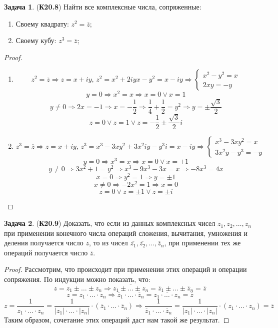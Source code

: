 \documentclass[12pt]{article}
\theoremstyle{definition}
\newtheorem{problem}{Задача}
\newcommand{\ovl}[1]{\overline{#1}}
\begin{document}
\begin{problem}(\textbf{К20.8})
	Найти все комплексные числа, сопряженные:
	\begin{enumerate}[label=\asbuk*)]
		\item Своему квадрату: $z^2 = \ovl{z}$;
		\item Своему кубу: $z^3 = \ovl{z}$;
	\end{enumerate}
\end{problem}
\begin{proof}\hfill
	\begin{enumerate}[label=\asbuk*)]
		\item 
		$$
			z^2 = \ovl{z} \Rightarrow z = x + iy, \, z^2 = x^2 + 2iyx - y^2 = x -iy \Rightarrow 		\begin{cases}
				x^2 - y^2 = x\\
				2xy = -y 
			\end{cases}
		$$
		$$
			y = 0 \Rightarrow x^2 = x \Rightarrow x = 0 \vee x = 1
		$$
		$$
			y \neq 0 \Rightarrow 2x = -1 \Rightarrow x = -\dfrac{1}{2} \Rightarrow \dfrac{1}{4} +\dfrac{1}{2} = y^2 \Rightarrow y = \pm \dfrac{\sqrt{3}}{2}
		$$
		$$
			z = 0 \vee z = 1 \vee z = -\dfrac{1}{2} \pm \dfrac{\sqrt{3}}{2}i
		$$
		\item
		$$
			z^3 = \ovl{z} \Rightarrow z = x + iy, \, z^3 = x^3 - 3xy^2 + 3x^2iy - y^3i = x - iy \Rightarrow \begin{cases}
				x^3 - 3xy^2 = x\\
				3x^2y -y^3 = - y
			\end{cases}
		$$
		$$
			y = 0 \Rightarrow x^3 = x \Rightarrow x = 0 \vee x = \pm 1
		$$
		$$
			y \neq 0 \Rightarrow 3x^2+ 1 = y^2 \Rightarrow x^3 - 9x^3 -3x =x \Rightarrow -8x^3 = 4x 
		$$
		$$
			x = 0 \Rightarrow y^2 = 1 \Rightarrow y = \pm 1
		$$
		$$
			x \neq 0 \Rightarrow -2x^2 = 1 \Rightarrow x = 0
		$$
		$$
			z = 0 \vee z = \pm 1 \vee z = \pm i
		$$
	\end{enumerate}
\end{proof}

\begin{problem}(\textbf{К20.9})
	Доказать, что если из данных комплексных чисел $z_1, z_2, \dotsc, z_n$ при применении конечного числа операций сложения, вычитания, умножения и деления получается число $z$, то из чисел $\ovl{z_1}, \ovl{z_2}, \dotsc, \ovl{z}_n$, при применении тех же операций получается число $\ovl{z}$.
\end{problem}
\begin{proof}
	Рассмотрим, что происходит при применении этих операций и операции сопряжения. По индукции можно показать, что:
	$$
		z = z_1 \pm \dotsc \pm z_n \Rightarrow  \ovl{z_1 \pm \dotsc \pm z_n} = \ovl{z}_1 \pm \dotsc \pm \ovl{z}_n  = \ovl{z}
	$$
	$$
		z = z_1{\cdot}\dotsc{\cdot}z_n \Rightarrow \ovl{z}_1{\cdot}\dotsc{\cdot}\ovl{z}_n = \ovl{z_1{\cdot}\dotsc{\cdot}z_n} = \ovl{z}
	$$
	$$
		z = \dfrac{1}{z_1{\cdot}\dotsc{\cdot}z_n} = \dfrac{1}{|z_1|{\cdot}\dotsc{\cdot}|z_n|}{\cdot}(\ovl{z}_1{\cdot}\dotsc{\cdot}\ovl{z}_n) \Rightarrow \dfrac{1}{\ovl{z}_1{\cdot}\dotsc{\cdot}\ovl{z}_n} = \dfrac{1}{|z_1|{\cdot}\dotsc{\cdot}|z_n|}{\cdot}(z_1{\cdot} \dotsc{\cdot}z_n) = \ovl{z}
	$$
	Таким образом, сочетание этих операций даст нам такой же результат.
\end{proof}
\end{document}

